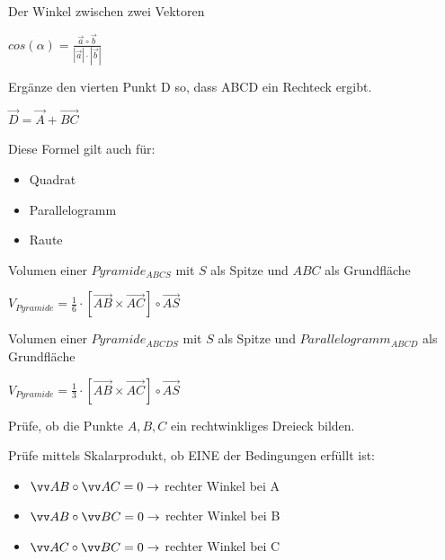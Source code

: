 \documentclass[paper=a6,landscape,ngerman,twoside=true,fontsize=12pt]{scrartcl}
\begin{document}
\begin{frage}
	
	Der Winkel zwischen zwei Vektoren
	
\end{frage}
\begin{antwort}
	\LARGE
	$cos(\alpha)=\frac{\vec{a} \circ \vec{b}}{|\vec{a}|\cdot|\vec{b}|}$
	
\end{antwort}	
\begin{frage}
	
	Ergänze den vierten Punkt D so, dass ABCD ein Rechteck ergibt.
	
\end{frage}
\begin{antwort}
	\LARGE
	$\vec{D}=\vec{A}+\vec{BC}$
	\bigskip
	\Large
	
	Diese Formel gilt auch für:$\hspace{6cm}$
	\begin{itemize}
		\item Quadrat
		\item Parallelogramm
		\item Raute		
	\end{itemize}	
\end{antwort}
\begin{frage}
	
	Volumen einer $Pyramide_{ABCS}$ mit $S$ als Spitze und $ABC$ als Grundfläche
	
\end{frage}
\begin{antwort}
	\LARGE
	$V_{Pyramide}=\frac{1}{6}\cdot [\vec{AB} \times \vec{AC}]\circ\vec{AS}$	
	
\end{antwort}		
\begin{frage}
	
	Volumen einer $Pyramide_{ABCDS}$ mit $S$ als Spitze und $Parallelogramm_{ABCD}$ als Grundfläche
	
\end{frage}
\begin{antwort}
	\LARGE
	$V_{Pyramide}=\frac{1}{3}\cdot [\vec{AB} \times \vec{AC}]\circ\vec{AS}$	
	
\end{antwort}
\begin{frage}
	Prüfe, ob die Punkte $A, B, C$ ein rechtwinkliges Dreieck bilden.
\end{frage}
\begin{antwort}
	Prüfe mittels Skalarprodukt, ob EINE der Bedingungen erfüllt ist:
	\begin{itemize}
		\item $\vec{AB} \mal \vec{AC}=0 \rightarrow$ rechter Winkel bei A 
		\item $\vec{AB} \mal \vec{BC}=0 \rightarrow$ rechter Winkel bei B 
		\item $\vec{AC} \mal \vec{BC}=0 \rightarrow$ rechter Winkel bei C
	\end{itemize}	
\end{antwort}	
\end{document}
